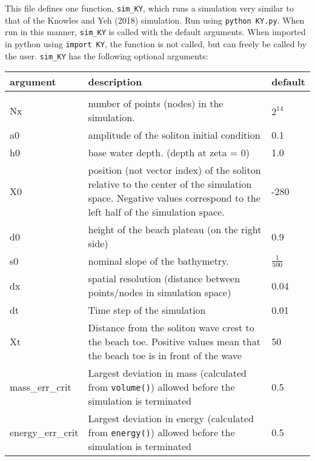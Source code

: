 \documentclass[10pt,a4paper]{article}
\newenvironment{optarglist}
    {\begin{center}
    \begin{tabular}{l|p{10cm}|l}
    argument & description & default\\
    \hline\\
    }
    { 
    \end{tabular} 
    \end{center}
    }
\begin{document}
This file defines one function, \texttt{sim\_KY}, which runs a simulation very similar to that of the Knowles and Yeh (2018) simulation.
Run using \texttt{python KY.py}. When run in this manner, \texttt{sim\_KY} is called with the default arguments. When imported in python using \texttt{import KY}, the function is not called, but can freely be called by the user. \texttt{sim\_KY} has the following optional arguments:

\begin{optarglist}
    Nx &
           number of points (nodes) in the simulation.& $2^{14}$ \\\hline
    
    a0  &    
           amplitude of the soliton initial condition & 0.1\\\hline

    h0      &  
           base water depth. (depth at zeta = 0)& 1.0\\\hline

    X0    &   
           position (not vector index) of the soliton relative to the center
            of the simulation space. Negative values correspond to the left
            half of the simulation space.& -280 \\\hline

    d0         &  
           height of the beach plateau (on the right side)& 0.9\\\hline

    s0      &     
           nominal slope of the bathymetry.&$\frac{1}{500}$ \\\hline

    dx     &   
           spatial resolution (distance between points/nodes in simulation
            space)& 0.04\\\hline
    
    dt    &  
           Time step of the simulation& 0.01\\\hline
    
    Xt   &    
           Distance from the soliton wave crest to the beach toe. Positive
            values mean that the beach toe is in front of the wave& 50\\\hline

    mass\_err\_crit &
           Largest deviation in mass (calculated from \texttt{volume()}) allowed before the
            simulation is terminated& 0.5\\\hline
            
    energy\_err\_crit&
           Largest deviation in energy (calculated from \texttt{energy()}) allowed before the
            simulation is terminated& 0.5 \\\hline
    

\end{optarglist}
\end{document}
